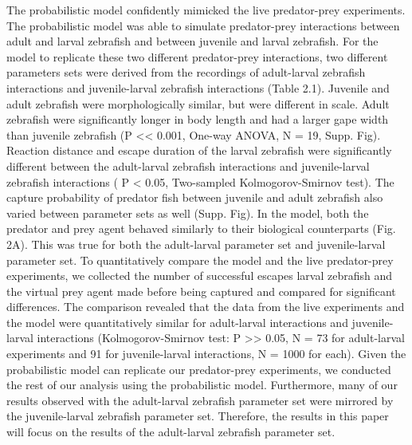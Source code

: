 \documentclass[]{rsos}%
\begin{document}
The probabilistic model confidently mimicked the live predator-prey experiments. The probabilistic model was able to simulate predator-prey interactions between adult and larval zebrafish and between juvenile and larval zebrafish. For the model to replicate these two different predator-prey interactions, two different parameters sets were derived from the recordings of adult-larval zebrafish interactions and juvenile-larval zebrafish interactions (Table 2.1). Juvenile and adult zebrafish were morphologically similar, but were different in scale. Adult zebrafish were significantly longer in body length and had a larger gape width than juvenile zebrafish (P << 0.001, One-way ANOVA, N = 19, Supp. Fig). Reaction distance and escape duration of the larval zebrafish were significantly different between the adult-larval zebrafish interactions and juvenile-larval zebrafish interactions ( P < 0.05, Two-sampled Kolmogorov-Smirnov test). The capture probability of predator fish between juvenile and adult zebrafish also varied between parameter sets as well (Supp. Fig). In the model, both the predator and prey agent behaved similarly to their biological counterparts (Fig. 2A). This was true for both the adult-larval parameter set and juvenile-larval parameter set. To quantitatively compare the model and the live predator-prey experiments, we collected the number of successful escapes larval zebrafish and the virtual prey agent made before being captured and compared for significant differences. The comparison revealed that the data from the live experiments and the model were quantitatively similar for adult-larval interactions and juvenile-larval interactions (Kolmogorov-Smirnov test: P >> 0.05, N = 73 for adult-larval experiments and 91 for juvenile-larval interactions, N = 1000 for each). Given the probabilistic model can replicate our predator-prey experiments, we conducted the rest of our analysis using the probabilistic model. Furthermore, many of our results observed with the adult-larval zebrafish parameter set were mirrored by the juvenile-larval zebrafish parameter set. Therefore, the results in this paper will focus on the results of the adult-larval zebrafish parameter set.
\end{document}
